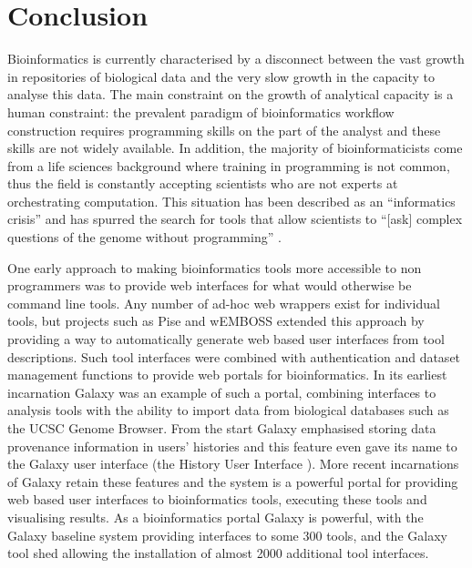 \documentclass[a4paper,10pt]{scrreprt} \usepackage[utf8]{inputenc}
\begin{document}
\section{Conclusion}

Bioinformatics is currently characterised by a disconnect between the vast growth in repositories of biological data and the very slow growth in the capacity to analyse this data. The main constraint on the growth of analytical capacity is a human constraint: the prevalent paradigm of bioinformatics workflow construction requires programming skills on the part of the analyst and these skills are not widely available. In addition, the majority of bioinformaticists come from a life sciences background where training in programming is not common, thus the field is constantly accepting scientists who are not experts at orchestrating computation. This situation has been described as an ``informatics crisis'' \cite{goecks_galaxy:_2010} and has spurred the search for tools that allow scientists to ``[ask] complex questions of the genome without programming'' \cite{woollard_asking_2010}.

One early approach to making bioinformatics tools more accessible to non programmers was to provide web interfaces for what would otherwise be command line tools. Any number of ad-hoc web wrappers exist for individual tools, but projects such as Pise \cite{gilbert_pise:_2002} and wEMBOSS \cite{sarachu_wemboss:_2005} extended this approach by providing a way to automatically generate web based user interfaces from tool descriptions. Such tool interfaces were combined with authentication and dataset management functions to provide web portals for bioinformatics. In its earliest incarnation Galaxy \cite{nekrutenko_introduction_2011} was an example of such a portal, combining interfaces to analysis tools with the ability to import data from biological databases such as the UCSC Genome Browser. From the start Galaxy emphasised storing data provenance information in users' histories and this feature even gave its name to the Galaxy user interface (the History User Interface \cite{giardine_galaxy:_2005}). More 
recent incarnations of Galaxy retain these features and the system is a powerful portal for providing web based user interfaces to bioinformatics tools, executing these tools and visualising results. As a bioinformatics portal Galaxy is powerful, with the Galaxy baseline system providing interfaces to some 300 tools, and the Galaxy tool shed allowing the installation of almost 2000 additional tool interfaces.
\end{document}
